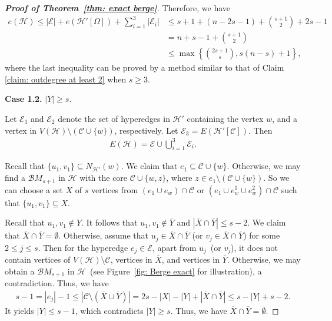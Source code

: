 \documentclass[11pt]{article}
\numberwithin{equation}{section}
\newcommand\cB{{\mathcal B}}
\newcommand\cC{{\mathcal C}}
\newcommand\cE{{\mathcal E}}
\newcommand\cH{{\mathcal H}}
\begin{document}
\begin{proof}[\bf Proof of Theorem~\ref{thm: exact berge}]
        Therefore, we have
        \begin{equation*}
        \begin{aligned}
            e(\cH)\leq   |\cE|+ e(\cH'[\Omega])+\sum_{i=1}^{3}|\cE_{i}| &\le s + 1+(n - 2s - 1) + \binom{s+1}{2} + 2s-1 \\
            & = n+s-1+\binom{s+1}{2} \\
            &\le \max\left\{ \binom{2s+1}{s}, s(n-s)+1 \right\},
        \end{aligned}
        \end{equation*}
        where the last inequality can be proved by a method similar to that of Claim \ref{claim: outdegree at least 2} when $s\geq3$.

    \smallskip
    \noindent\textbf{Case 1.2.} $|Y| \ge s$.
    \smallskip
    \smallskip

    Let $\cE_{1}$ and $\cE_{2}$ denote the set of  hyperedges in $\cH'$ containing the vertex $w$, and a vertex in $V(\cH)\setminus (\cC \cup \{w\})$, respectively. Let $\cE_{3}=E(\cH'[\cC])$.
    Then
    \begin{align*}
    E(\cH)= \cE\cup \bigcup_{i=1}^{3}\cE_{i}.
    \end{align*}

    Recall that $\{u_1,v_1\}\subseteq N_{\cH'}(w)$. %
    We claim that $e_1 \subseteq \cC\cup \{w\}$. Otherwise, we may find a $\cB M_{s+1}$ in $\cH$ with the core $\cC\cup\{w,z\}$, where $z\in e_1\setminus \left(\cC\cup \{w\}\right)$.
    So we can choose a set $X$ of $s$ vertices from $(e_1 \cup e_w) \cap \cC$ or $(e_1 \cup e_{w}^1 \cup e_{w}^2) \cap \cC$ such that  $\{u_1,v_1\}\subseteq X$.

    Recall that $u_1,v_1\notin Y$. It follows that $u_1,v_1\notin \overline{Y}$ and $|\overline{X} \cap \overline{Y}| \le s-2$.
    We claim that $\overline{X} \cap \overline{Y} = \emptyset$.
    Otherwise, assume that $u_j\in \overline{X} \cap \overline{Y}$ (or $v_j\in \overline{X} \cap \overline{Y}$)  for some $2 \le j \le s$.
    Then for the hyperedge $e_j \in \cE$, apart from $u_j$~(or $v_j$), it does not contain vertices of $V(\cH)\setminus \cC$, vertices in $\overline{X}$, and vertices in $\overline{Y}$. Otherwise, we may obtain a $\cB M_{s+1}$ in $\cH$~(see Figure~\ref{fig: Berge exact} for illustration), a contradiction.
    Thus, we have
        \begin{equation*}
        \begin{aligned}
            s- 1=|e_j| -1 \le |\cC \setminus (\overline{X} \cup \overline{Y})| = 2s-|X|-|Y| + |\overline{X} \cap \overline{Y}| \le s - |Y| + s - 2.
        \end{aligned}
        \end{equation*}
        It yields $|Y| \le s-1$, which contradicts $|Y|\ge s$. Thus, we have $\overline{X} \cap \overline{Y} = \emptyset$.


\end{proof}
\end{document}
